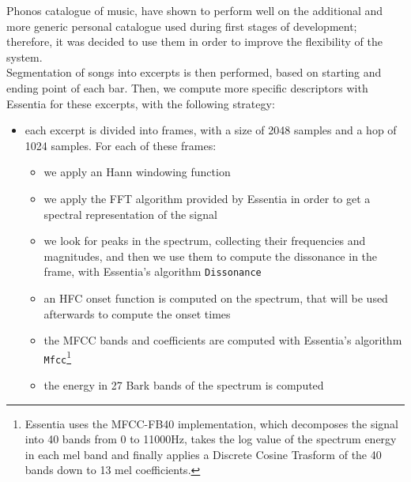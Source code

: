  Phonos catalogue of music, have shown to perform well on the additional and more generic personal catalogue used during first stages of development; therefore, it was decided to use them in order to improve the flexibility of the system. \\ Segmentation of songs into excerpts is then performed, based on starting and ending point of each bar. Then, we compute more specific descriptors with Essentia for these excerpts, with the following strategy:
\begin{itemize}
\item each excerpt is divided into frames, with a size of 2048 samples and a hop of 1024 samples. For each of these frames:
\begin{itemize}
\item we apply an Hann windowing function
\item we apply the FFT algorithm provided by Essentia in order to get a spectral representation of the signal
\item we look for peaks in the spectrum, collecting their frequencies and magnitudes, and then we use them to compute the dissonance in the frame, with Essentia's algorithm \texttt{Dissonance}
\item an HFC onset function is computed on the spectrum, that will be used afterwards to compute the onset times
\item the MFCC bands and coefficients are computed with Essentia's algorithm \texttt{Mfcc}\footnote{Essentia uses the MFCC-FB40 implementation, which decomposes the signal into 40 bands from 0 to 11000Hz, takes the log value of the spectrum energy in each mel band and finally applies a Discrete Cosine Trasform of the 40 bands down to 13 mel coefficients.} 
\item the energy in 27 Bark bands of the spectrum is computed 
\begin{figure}[h]\hskip -1cm
\end{figure}
\end{itemize}
\end{itemize}

